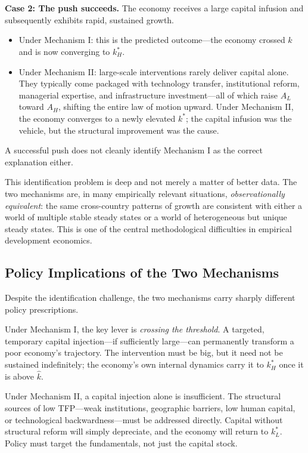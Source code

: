 \medskip

\noindent\textbf{Case 2: The push succeeds.} The economy receives a large capital infusion and subsequently exhibits rapid, sustained growth.

\begin{itemize}
    \item Under Mechanism I: this is the predicted outcome---the economy crossed $\hat{k}$ and is now converging to $k_H^*$.
    \item Under Mechanism II: large-scale interventions rarely deliver capital alone. They typically come packaged with technology transfer, institutional reform, managerial expertise, and infrastructure investment---all of which raise $A_L$ toward $A_H$, shifting the entire law of motion upward. Under Mechanism II, the economy converges to a newly elevated $k^*$; the capital infusion was the vehicle, but the structural improvement was the cause.
\end{itemize}
A successful push does not cleanly identify Mechanism I as the correct explanation either.

\medskip

This identification problem is deep and not merely a matter of better data. The two mechanisms are, in many empirically relevant situations, \textit{observationally equivalent}: the same cross-country patterns of growth are consistent with either a world of multiple stable steady states or a world of heterogeneous but unique steady states. This is one of the central methodological difficulties in empirical development economics.

\subsection{Policy Implications of the Two Mechanisms}

Despite the identification challenge, the two mechanisms carry sharply different policy prescriptions.

Under Mechanism I, the key lever is \textit{crossing the threshold}. A targeted, temporary capital injection---if sufficiently large---can permanently transform a poor economy's trajectory. The intervention must be big, but it need not be sustained indefinitely; the economy's own internal dynamics carry it to $k_H^*$ once it is above $\hat{k}$.

Under Mechanism II, a capital injection alone is insufficient. The structural sources of low TFP---weak institutions, geographic barriers, low human capital, or technological backwardness---must be addressed directly. Capital without structural reform will simply depreciate, and the economy will return to $k_L^*$. Policy must target the fundamentals, not just the capital stock.

